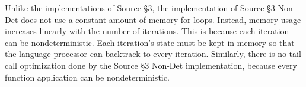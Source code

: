 Unlike the implementations of Source \S 3,  the implementation of Source \S 3 Non-Det does not use a constant amount of memory for loops. Instead, memory usage increases linearly with the number of iterations. This is because each iteration can be nondeterministic. Each iteration's state must be kept in memory so that the language processor can backtrack to every iteration. Similarly, there is no tail call optimization done by the Source \S 3 Non-Det implementation, because every function application can be nondeterministic.




\newpage



\newpage
































\newpage



\newpage



\newpage



    
